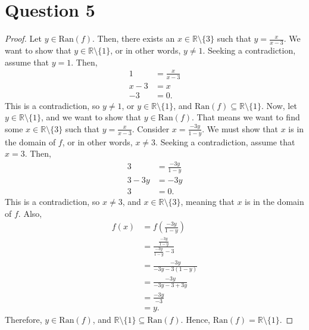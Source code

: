 \documentclass{article}
\begin{document}
\section*{Question 5}
\begin{proof}
    Let $y \in \text{Ran}(f)$.
    Then, there exists an $x \in \mathbb{R} \setminus \{3\}$ such that $y = \frac{x}{x-3}$.
    We want to show that $y \in \mathbb{R} \setminus \{1\}$, or in other words, $y \neq 1$.
    Seeking a contradiction, assume that $y = 1$.
    Then,
    \begin{align*}
        1 &= \frac{x}{x-3} \\
        x - 3 &= x \\
        -3 &= 0.
    \end{align*}
    This is a contradiction, so $y \neq 1$, or $y \in \mathbb{R} \setminus \{1\}$, and $\text{Ran}(f) \subseteq \mathbb{R} \setminus \{1\}$.
    Now, let $y \in \mathbb{R} \setminus \{1\}$, and we want to show that $y \in \text{Ran}(f)$.
    That means we want to find some $x \in \mathbb{R} \setminus \{3\}$ such that $y = \frac{x}{x-3}$.
    Consider $x = \frac{-3y}{1 - y}$.
    We must show that $x$ is in the domain of $f$, or in other words, $x \neq 3$.
    Seeking a contradiction, assume that $x = 3$.
    Then,
    \begin{align*}
        3 &= \frac{-3y}{1 - y} \\
        3 - 3y &= -3y \\
        3 &= 0.
    \end{align*}
    This is a contradiction, so $x \neq 3$, and $x \in \mathbb{R} \setminus \{3\}$, meaning that $x$ is in the domain of $f$.
    Also,
    \begin{align*}
        f(x) &= f\left(\frac{-3y}{1 - y}\right) \\
        &= \frac{\frac{-3y}{1 - y}}{\frac{-3y}{1 - y} - 3} \\
        &= \frac{-3y}{-3y - 3(1 - y)} \\
        &= \frac{-3y}{-3y - 3 + 3y} \\
        &= \frac{-3y}{-3} \\
        &= y.
    \end{align*}
    Therefore, $y \in \text{Ran}(f)$, and $\mathbb{R} \setminus \{1\} \subseteq \text{Ran}(f)$.
    Hence, $\text{Ran}(f) = \mathbb{R} \setminus \{1\}$.
\end{proof}
\end{document}
